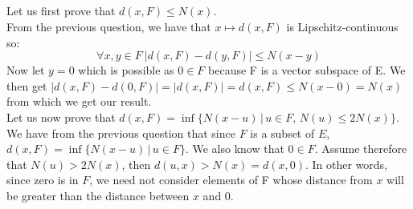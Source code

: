 \documentclass{article}
\begin{document}
\subsection{} %

Let us first prove that $d(x, F) \leq N(x)$. \\
From the previous question, we have that $x \mapsto d(x, F)$ is Lipschitz-continuous so: $$\forall x, y \in F \  |d(x, F) -d(y, F)| \leq N(x - y)$$ Now let $y=0$ which is possible as $0 \in F$ because F is a vector subspace of E. We then get $|d(x, F) -d(0, F)| = |d(x, F)| = d(x, F) \leq N(x -0) = N(x)$ from which we get our result. \\

\noindent Let us now prove that $d(x, F) = \inf \{N(x-u) \,| \, u \in F, \, N(u) \leq 2N(x) \}$. We have from the previous question that since $F$ is a subset of $E$, $d(x, F) = \inf \{N(x-u) \,| \, u \in F\}$. We also know that $0 \in F$. Assume therefore that $N(u) > 2N(x)$, then $d(u,x) > N(x) = d(x,0)$. In other words, since zero is in $F$, we need not consider elements of F whose distance from $x$ will be greater than the distance between $x$ and $0$.

\subsection{} %
\end{document}
